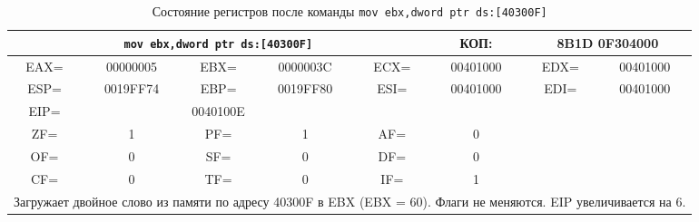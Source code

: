 \begin{table}[H]
    \centering
    \caption{Состояние регистров после команды \texttt{mov ebx,dword ptr ds:[40300F]}}
    \label{tab:after_mov_ebx}
    \small
    \renewcommand{\arraystretch}{1.3}
    \begin{tabular}{|c|c|c|c|c|c|c|c|}
    \hline
    \multicolumn{5}{|c|}{\cellcolor{green!40}\textbf{\texttt{mov ebx,dword ptr ds:[40300F]}}} & \cellcolor{green!20} КОП: & \multicolumn{2}{c|}{\cellcolor{green!20} 8B1D 0F304000} \\
    \hline
    \cellcolor{blue!30} EAX= & 00000005 & \cellcolor{blue!30} EBX= & \cellcolor{red!70} 0000003C & \cellcolor{blue!30} ECX= & 00401000 & \cellcolor{blue!30} EDX= & 00401000 \\
    \hline
    \cellcolor{blue!30} ESP= & 0019FF74 & \cellcolor{blue!30} EBP= & 0019FF80 & \cellcolor{blue!30} ESI= & 00401000 & \cellcolor{blue!30} EDI= & 00401000 \\
    \hline
    \cellcolor{blue!30} EIP= & \multicolumn{3}{c|}{\cellcolor{red!70} 0040100E} & \multicolumn{4}{c|}{} \\
    \hline
    \cellcolor{pink} ZF= & 1 & \cellcolor{pink} PF= & 1 & \cellcolor{pink} AF= & 0 & \multicolumn{2}{c|}{\cellcolor{gray!50}} \\
    \cline{1-6}
    \cellcolor{pink} OF= & 0 & \cellcolor{pink} SF= & 0 & \cellcolor{pink} DF= & 0 & \multicolumn{2}{c|}{\cellcolor{gray!50}} \\
    \cline{1-6}
    \cellcolor{pink} CF= & 0 & \cellcolor{pink} TF= & 0 & \cellcolor{pink} IF= & 1 & \multicolumn{2}{c|}{\cellcolor{gray!50}} \\
    \hline
    \multicolumn{8}{|p{14cm}|}{Загружает двойное слово из памяти по адресу 40300F в EBX (EBX = 60). Флаги не меняются. EIP увеличивается на 6.} \\
    \hline
    \end{tabular}
\end{table}

